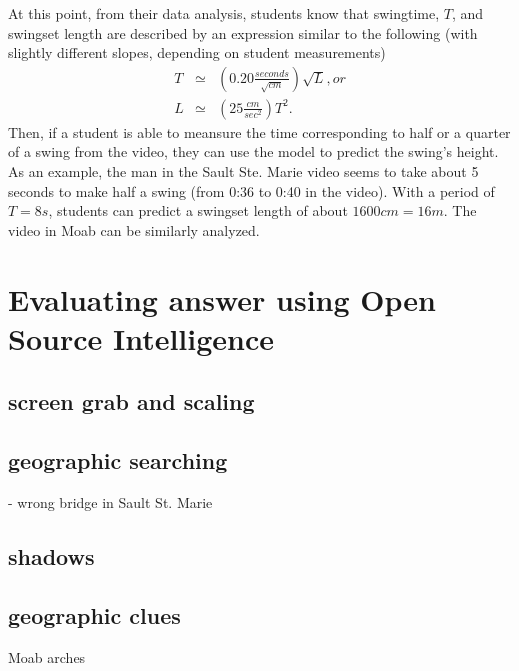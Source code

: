\documentclass[12pt]{iopart}
\newcommand{\bea}{\begin{eqnarray}}
\newcommand{\eea}{\end{eqnarray}}
\begin{document}
At this point, from their data analysis, students know that swingtime, $T$, and swingset length are described by an expression similar to the following (with slightly different slopes, depending on student measurements)
\bea
T &\simeq& \left( 0.20\frac{seconds}{\sqrt{cm}} \right) \sqrt{L}, or\\
L &\simeq& \left( 25 \frac{cm}{sec^2} \right) T^2.
\eea
Then, if a student is able to meansure the time corresponding to half or a quarter of a swing from the video, they can use the model to predict the swing's height.  As an example, the man in the Sault Ste. Marie video seems to take about 5 seconds to make half a swing (from 0:36 to 0:40 in the video)\cite{details}.  With a period of $T=8s$, students can predict a swingset length of about $1600cm=16m$.  
The video in Moab can be similarly analyzed.   

\section{Evaluating answer using Open Source Intelligence}

\subsection{screen grab and scaling}

\subsection{geographic searching}
- wrong bridge in Sault St. Marie

\subsection{shadows}

\subsection{geographic clues}
Moab arches

\clearpage
\end{document}
